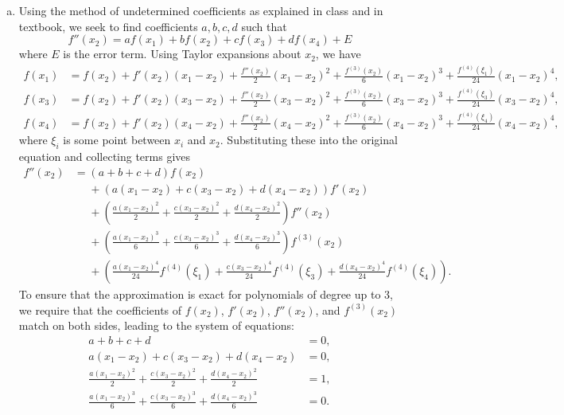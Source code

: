 \documentclass{article}
\begin{document}
\begin{enumerate}[a)]
  \item Using the method of undetermined coefficients as explained in class and in textbook, we seek to find coefficients
        $a,b,c,d$ such that
        \begin{equation}
          f''(x_2) = a f(x_1) + b f(x_2) + c f(x_3) + d f(x_4) + E
        \end{equation}
        where $E$ is the error term. Using Taylor expansions about $x_2$, we have
        \begin{align}
          f(x_1) & = f(x_2) + f'(x_2)(x_1-x_2) + \frac{f''(x_2)}{2}(x_1-x_2)^2 + \frac{f^{(3)}(x_2)}{6}(x_1-x_2)^3 + \frac{f^{(4)}(\xi_1)}{24}(x_1-x_2)^4, \\
          f(x_3) & = f(x_2) + f'(x_2)(x_3-x_2) + \frac{f''(x_2)}{2}(x_3-x_2)^2 + \frac{f^{(3)}(x_2)}{6}(x_3-x_2)^3 + \frac{f^{(4)}(\xi_3)}{24}(x_3-x_2)^4, \\
          f(x_4) & = f(x_2) + f'(x_2)(x_4-x_2) + \frac{f''(x_2)}{2}(x_4-x_2)^2 + \frac{f^{(3)}(x_2)}{6}(x_4-x_2)^3 + \frac{f^{(4)}(\xi_4)}{24}(x_4-x_2)^4,
        \end{align}
        where $\xi_i$ is some point between $x_i$ and $x_2$. Substituting these into
        the original equation and collecting terms gives
        \begin{align}
          f''(x_2) & = (a+b+c+d)f(x_2)                                                                                     \\
                   & \phantom{=}+ (a(x_1-x_2)+c(x_3-x_2)+d(x_4-x_2))f'(x_2)                                               \\
                   & \phantom{=}+ \left(\frac{a(x_1-x_2)^2}{2} + \frac{c(x_3-x_2)^2}{2} + \frac{d(x_4-x_2)^2}{2}\right)f''(x_2)               \\
                   & \phantom{=}+ \left(\frac{a(x_1-x_2)^3}{6} + \frac{c(x_3-x_2)^3}{6} + \frac{d(x_4-x_2)^3}{6}\right)f^{(3)}(x_2)               \\
                   & \phantom{=}+ \left(\frac{a(x_1-x_2)^4}{24}f^{(4)}(\xi_1) + \frac{c(x_3-x_2)^4}{24}f^{(4)}(\xi_3) + \frac{d(x_4-x_2)^4}{24}f^{(4)}(\xi_4)\right).
        \end{align}
        To ensure that the approximation is exact for polynomials of degree up to 3, we require that the coefficients of $f(x_2)$, $f'(x_2)$, $f''(x_2)$, and $f^{(3)}(x_2)$ match on both sides, leading to the system of equations:
        \begin{align}
          a + b + c + d & = 0, \\
          a(x_1 - x_2) + c(x_3 - x_2) + d(x_4 - x_2) & = 0, \\
          \frac{a(x_1 - x_2)^2}{2} + \frac{c(x_3 - x_2)^2}{2} + \frac{d(x_4 - x_2)^2}{2} & = 1, \\
          \frac{a(x_1 - x_2)^3}{6} + \frac{c(x_3 - x_2)^3}{6} + \frac{d(x_4 - x_2)^3}{6} & = 0.
        \end{align}
\end{enumerate}
\end{document}

